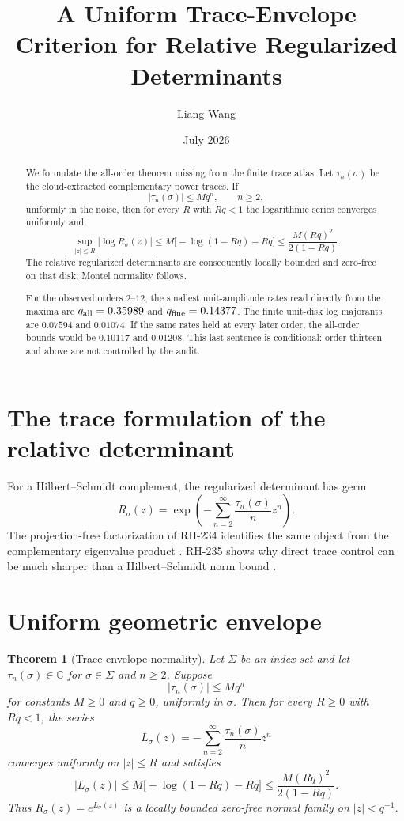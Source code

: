 \documentclass[11pt]{article}
\title{A Uniform Trace-Envelope Criterion for Relative Regularized Determinants}
\author{Liang Wang}
\date{July 2026}
\newtheorem{theorem}{Theorem}[section]
\theoremstyle{remark}
\begin{document}
\maketitle

\begin{abstract}
We formulate the all-order theorem missing from the finite trace atlas.  Let
$\tau_n(\sigma)$ be the cloud-extracted complementary power traces.  If
\[
 |\tau_n(\sigma)|\le Mq^n,\qquad n\ge2,
\]
uniformly in the noise, then for every $R$ with $Rq<1$ the logarithmic series
converges uniformly and
\[
 \sup_{|z|\le R}|\log R_\sigma(z)|
 \le M\bigl[-\log(1-Rq)-Rq\bigr]
 \le \frac{M(Rq)^2}{2(1-Rq)}.
\]
The relative regularized determinants are consequently locally bounded and
zero-free on that disk; Montel normality follows.

For the observed orders $2$--$12$, the smallest unit-amplitude rates read
directly from the maxima are $q_{\rm all}=0.35989$ and
$q_{\rm fine}=0.14377$.  The finite unit-disk log majorants are $0.07594$ and
$0.01074$.  If the same rates held at every later order, the all-order bounds
would be $0.10117$ and $0.01208$.  This last sentence is conditional: order
thirteen and above are not controlled by the audit.
\end{abstract}

\section{The trace formulation of the relative determinant}

For a Hilbert--Schmidt complement, the regularized determinant has germ
\[
 R_\sigma(z)=\exp\left(
 -\sum_{n=2}^{\infty}\frac{\tau_n(\sigma)}{n}z^n
 \right).
\]
The projection-free factorization of RH-234 identifies the same object from
the complementary eigenvalue product \citep{WangRH234,Simon2005}.  RH-235
shows why direct trace control can be much sharper than a Hilbert--Schmidt
norm bound \citep{WangRH235}.

\section{Uniform geometric envelope}

\begin{theorem}[Trace-envelope normality]\label{thm:envelope}
Let $\Sigma$ be an index set and let $\tau_n(\sigma)\in\mathbb C$ for
$\sigma\in\Sigma$ and $n\ge2$.  Suppose
\[
 |\tau_n(\sigma)|\le Mq^n
\]
for constants $M\ge0$ and $q\ge0$, uniformly in $\sigma$.  Then for every
$R\ge0$ with $Rq<1$, the series
\[
 L_\sigma(z)=-\sum_{n=2}^{\infty}\frac{\tau_n(\sigma)}{n}z^n
\]
converges uniformly on $|z|\le R$ and satisfies
\[
 |L_\sigma(z)|
 \le M\bigl[-\log(1-Rq)-Rq\bigr]
 \le \frac{M(Rq)^2}{2(1-Rq)}.
\]
Thus $R_\sigma(z)=e^{L_\sigma(z)}$ is a locally bounded zero-free normal
family on $|z|<q^{-1}$.
\end{theorem}
\end{document}
